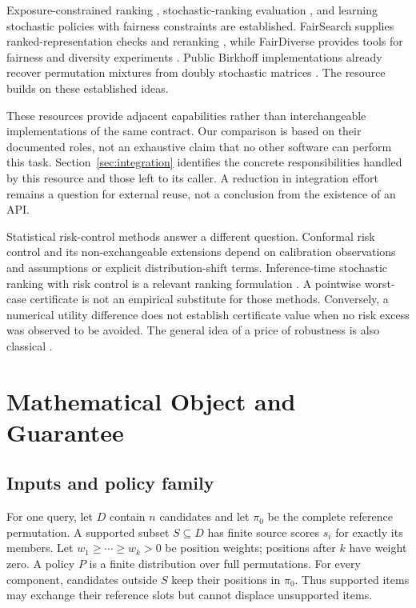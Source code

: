 \documentclass[runningheads]{llncs}
\begin{document}
Exposure-constrained ranking \cite{singh}, stochastic-ranking evaluation
\cite{diaz}, and learning stochastic policies with fairness constraints
\cite{fairpgrank} are established. FairSearch supplies ranked-representation
checks and reranking \cite{fairsearch}, while FairDiverse provides tools for
fairness and diversity experiments \cite{fairdiverse}. Public Birkhoff
implementations already recover permutation mixtures from doubly stochastic
matrices \cite{birkhoff}. The resource builds on these established ideas.

These resources provide adjacent capabilities rather than interchangeable
implementations of the same contract. Our comparison is based on their
documented roles, not an exhaustive claim that no other software can perform
this task. Section~\ref{sec:integration} identifies the concrete responsibilities
handled by this resource and those left to its caller. A reduction in
integration effort remains a question for external reuse, not a conclusion
from the existence of an API.

Statistical risk-control methods answer a different question.
Conformal risk control and its non-exchangeable extensions
\cite{crc,nonexchangeable} depend on calibration observations and assumptions
or explicit distribution-shift terms. Inference-time stochastic ranking with
risk control is a relevant ranking formulation \cite{isrr}.
A pointwise worst-case certificate is not an empirical substitute for those
methods. Conversely, a numerical utility difference does not establish
certificate value when no risk excess was observed to be avoided.
The general idea of a price of robustness is also classical \cite{bertsimas}.

\section{Mathematical Object and Guarantee}
\subsection{Inputs and policy family}
For one query, let $D$ contain $n$ candidates and let $\pi_0$ be the complete
reference permutation. A supported subset $S\subseteq D$ has finite source
scores $s_i$ for exactly its members. Let
$w_1\geq \cdots\geq w_k>0$ be position weights; positions after $k$ have
weight zero. A policy $P$ is a finite distribution over full permutations.
For every component, candidates outside $S$ keep their positions in $\pi_0$.
Thus supported items may exchange their reference slots but cannot displace
unsupported items.
\end{document}
